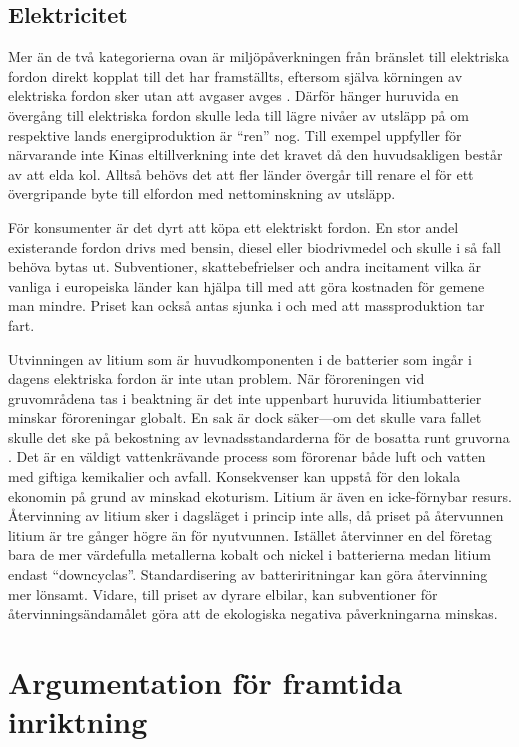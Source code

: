\documentclass{article}
\begin{document}
\subsection{Elektricitet}

Mer än de två kategorierna ovan är miljöpåverkningen från bränslet till elektriska fordon
direkt kopplat till det har framställts,
eftersom själva körningen av elektriska fordon sker utan att avgaser avges
\autocite{persson18}.
Därför hänger huruvida en övergång till elektriska fordon skulle leda till
lägre nivåer av utsläpp på om respektive lands energiproduktion är ``ren'' nog.
Till exempel uppfyller för närvarande inte Kinas eltillverkning inte det kravet
då den huvudsakligen består av att elda kol.
Alltså behövs det att fler länder övergår till renare el för ett övergripande byte till elfordon
med nettominskning av utsläpp.

För konsumenter är det dyrt att köpa ett elektriskt fordon.
En stor andel existerande fordon drivs med bensin, diesel eller biodrivmedel
och skulle i så fall behöva bytas ut.
Subventioner, skattebefrielser och andra incitament vilka är vanliga i europeiska länder
kan hjälpa till med att göra kostnaden för gemene man mindre.
Priset kan också antas sjunka i och med att massproduktion tar fart.

Utvinningen av litium som är huvudkomponenten i de batterier som ingår i dagens elektriska fordon
är inte utan problem.
När föroreningen vid gruvområdena tas i beaktning är det inte uppenbart huruvida
litiumbatterier minskar föroreningar globalt.
En sak är dock säker---om det skulle vara fallet skulle det ske på bekostning
av levnadsstandarderna för de bosatta runt gruvorna \autocite{persson18}.
Det är en väldigt vattenkrävande process som förorenar både luft och vatten
med giftiga kemikalier och avfall.
Konsekvenser kan uppstå för den lokala ekonomin på grund av minskad ekoturism.
Litium är även en icke-förnybar resurs.
Återvinning av litium sker i dagsläget i princip inte alls,
då priset på återvunnen litium är tre gånger högre än för nyutvunnen.
Istället återvinner en del företag bara de mer värdefulla metallerna kobalt och nickel
i batterierna medan litium endast ``downcyclas''.
Standardisering av batteriritningar kan göra återvinning mer lönsamt.
Vidare, till priset av dyrare elbilar, kan subventioner för återvinningsändamålet
göra att de ekologiska negativa påverkningarna minskas.

\section{Argumentation för framtida inriktning}
\end{document}
